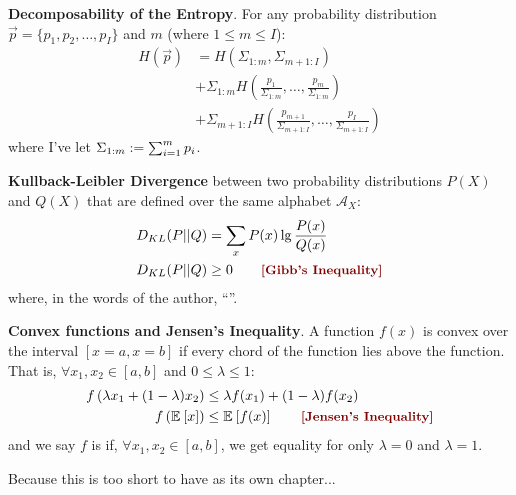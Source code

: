 \documentclass[11pt]{article}
\begin{document}
\begin{compactitem}[-]
	\item \textbf{Decomposability of the Entropy}. For any probability distribution $\vec p = \{p_1, p_2, \ldots, p_I\}$ and $m$ (where $1 \le m \le I$):
	\begin{align}
		H(\vec{p}) &= H\left( \Sigma_{1:m}, \Sigma_{m+1:I} \right) \\
		&+ \Sigma_{1:m} H\left( \frac{p_1}{\Sigma_{1:m}}, \ldots, \frac{p_m}{\Sigma_{1:m}} \right) \\
		&+ \Sigma_{m+1:I} H\left( \frac{p_{m+1}}{\Sigma_{m+1:I}}, \ldots, \frac{p_I}{\Sigma_{m+1:I}} \right)
	\end{align}
	where I've let $\Sigma_{1:m} := \sum_{i=1}^{m} p_i$.
	
	\item \textbf{Kullback-Leibler Divergence} between two probability distributions $P(X)$ and $Q(X)$ that are defined over the same alphabet $\mathcal{A}_X$:
	\begin{align}
		D_{KL}(P||Q) &= \sum_x P(x) \lg \frac{P(x)}{Q(x)} \\
		 D_{KL}(P||Q) &\ge 0 \qquad \mtred{[Gibb's Inequality]} 
	\end{align}
	where, in the words of the author, ``''.
	
	\item \textbf{Convex functions and Jensen's Inequality}. A function $f(x)$ is convex over the interval $[x=a, x=b]$ if every chord of the function lies above the function. That is, $\forall x_1, x_2 \in [a, b]$ and $0 \le \lambda \le 1$:
	\begin{align}
		f\left(  \lambda x_1 + (1 - \lambda) x_2 \right) &\le \lambda f(x_1) + (1 - \lambda) f(x_2) \\
		f\left( \E{x} \right) &\le \E{f(x)} \qquad \mtred{[Jensen's Inequality]} 
	\end{align}
	and we say $f$ is  if, $\forall x_1, x_2 \in [a, b]$, we get equality for only $\lambda=0$ and $\lambda=1$. 
\end{compactitem}

\myspace
{}
\myspace

{\footnotesize Because this is too short to have as its own chapter...}
\end{document}
